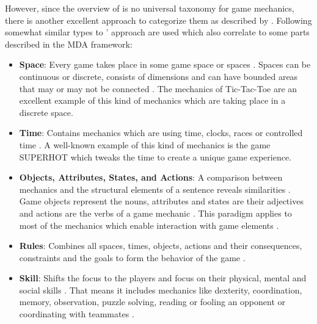 \documentclass[MGS,Master,english]{twbook}%
\begin{document}
However, since the overview of \citep{gameDesign::gameMechanicsAdvancedGameDesign} is no universal taxonomy for game mechanics, there is another excellent approach to categorize them as described by \citep{gameDesign::bookOfLenses}. Following somewhat similar types to ' approach are used which also correlate to some parts described in the \ac{MDA} framework:
\begin{itemize}
	\item \textbf{Space}: Every game takes place in some game space or spaces \cite{gameDesign::bookOfLenses}. Spaces can be continuous or discrete, consists of dimensions and can have bounded areas that may or may not be connected \cite{gameDesign::bookOfLenses}. The mechanics of Tic-Tac-Toe are an excellent example of this kind of mechanics which are taking place in a discrete space. 
	\item \textbf{Time}: Contains mechanics which are using time, clocks, races or controlled time \cite{gameDesign::bookOfLenses}. A well-known example of this kind of mechanics is the game SUPERHOT \cite{game::superhot} which tweaks the time to create a unique game experience.
	\item \textbf{Objects, Attributes, States, and Actions}: A comparison between mechanics and the structural elements of a sentence reveals similarities \cite{gameDesign::bookOfLenses}. Game objects represent the nouns, attributes and states are their adjectives and actions are the verbs of a game mechanic \cite{gameDesign::bookOfLenses}. This paradigm applies to most of the mechanics which enable interaction with game elements \cite{gameDesign::bookOfLenses}. 
	\item \textbf{Rules}: Combines all spaces, times, objects, actions and their consequences, constraints and the goals to form the behavior of the game \cite{gameDesign::bookOfLenses}. 
	\item \textbf{Skill}: Shifts the focus to the players and focus on their physical, mental and social skills \cite{gameDesign::bookOfLenses}. That means it includes mechanics like dexterity, coordination, memory, observation, puzzle solving, reading or fooling an opponent or coordinating with teammates \cite{gameDesign::bookOfLenses}.  
\end{itemize}

\end{document}
